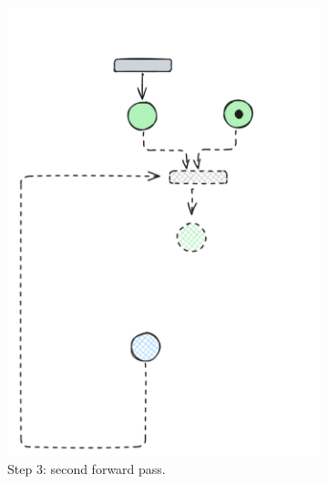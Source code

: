 \begin{figure}[H]
\begin{subfigure}[b]{0.23\textwidth}
		\includegraphics[width=\textwidth]{plots/bidirectional_pruning_step_d_updated_2.pdf}
		\caption{Step 3: second forward pass.}
		\label{fig:step:d}
	\end{subfigure}\hfill
	\begin{subfigure}[b][\subfigheight][b]{0.23\textwidth}
		\centering

\end{subfigure}
\end{figure}
